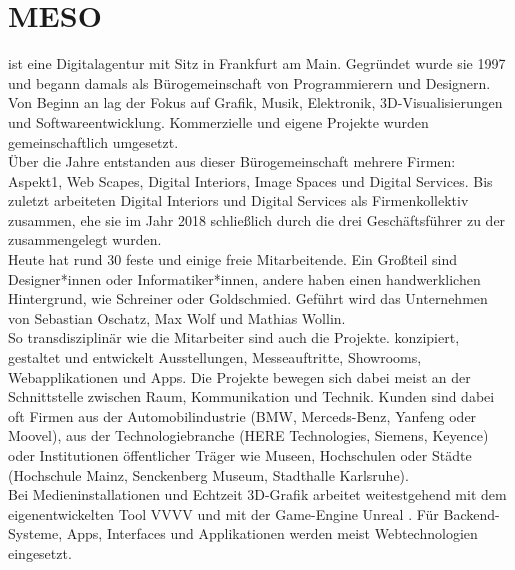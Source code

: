\section{MESO}
\label{sec:meso}

\mesoFull{} ist eine Digitalagentur mit Sitz in Frankfurt am Main.
Gegründet wurde sie 1997 und begann damals als Bürogemeinschaft von Programmierern
und Designern. Von Beginn an lag der Fokus auf Grafik, Musik, Elektronik, 3D-Visualisierungen
und Softwareentwicklung. Kommerzielle und eigene Projekte wurden gemeinschaftlich
umgesetzt.\\

Über die Jahre entstanden aus dieser Bürogemeinschaft mehrere Firmen: Aspekt1, \meso{} Web Scapes, \meso{}
Digital Interiors, \meso{} Image Spaces und \meso{} Digital Services. Bis zuletzt arbeiteten 
\meso{} Digital Interiors und \meso{} Digital Services als Firmenkollektiv zusammen, 
ehe sie im Jahr 2018 schließlich durch die drei Geschäftsführer zu der \mesoFull{} zusammengelegt
wurden.\\
Heute hat \meso{} rund 30 feste und einige freie Mitarbeitende. Ein Großteil sind Designer*innen 
oder Informatiker*innen, andere haben einen handwerklichen Hintergrund, wie Schreiner oder Goldschmied. 
Geführt wird das Unternehmen von Sebastian Oschatz, Max Wolf und Mathias Wollin.\\
So transdisziplinär wie die Mitarbeiter sind auch die Projekte. \meso{} konzipiert, gestaltet und entwickelt
Ausstellungen, Messeauftritte, Showrooms, Webapplikationen und Apps. Die Projekte bewegen sich dabei meist an der
Schnittstelle zwischen Raum, Kommunikation und Technik. Kunden sind dabei oft Firmen aus der
Automobilindustrie (BMW, Merceds-Benz, Yanfeng oder Moovel), aus der Technologiebranche (HERE Technologies,
Siemens, Keyence) oder Institutionen öffentlicher Träger wie Museen, Hochschulen oder Städte (Hochschule Mainz,
Senckenberg Museum, Stadthalle Karlsruhe).\\

Bei Medieninstallationen und Echtzeit 3D-Grafik arbeitet \meso{} weitestgehend mit dem eigenentwickelten 
Tool VVVV \cite{vvvv} und mit der Game-Engine Unreal \cite{unreal}. Für Backend-Systeme, Apps, Interfaces
und Applikationen werden meist Webtechnologien eingesetzt.
